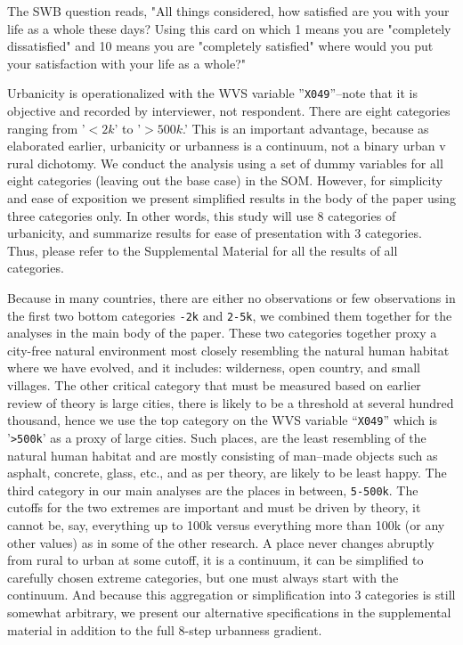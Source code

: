 \documentclass[10pt, letterpaper]{article}
\begin{document}
The SWB question reads, "All things considered, how  satisfied are you with your life as a whole these days? Using this card on which 1 means you are "completely dissatisfied" and 10 means you are "completely satisfied" where would you put your satisfaction with your life as a whole?"

Urbanicity is operationalized with the WVS variable ''\texttt{X049}''--note that it is objective and recorded by interviewer, not respondent.
There are eight categories ranging from '$<2k$' to '$>500k$.' This is an important advantage, because as elaborated earlier, urbanicity or urbanness is a continuum, not a binary urban v rural dichotomy. We conduct the analysis using a set of dummy variables for all eight categories (leaving out the base case) in the SOM. However, for simplicity and ease of exposition we present simplified results in the body of the paper using three categories only.
In other words, this study will use 8 categories of urbanicity, and summarize results for ease of presentation with 3 categories. Thus, please refer to the Supplemental Material for all the results of all categories.

Because in many countries, there are either no observations or few observations
in the first two bottom categories \texttt{-2k} and \texttt{2-5k}, we combined
them together for the analyses in the main body of the paper. These two
categories together proxy a city-free natural environment most closely resembling the natural human habitat where we have evolved, and it includes: wilderness, open country, and small villages. The other critical category that must be measured based on earlier review of theory is large cities, there is likely to be a threshold at several hundred thousand, hence we use the top category on the WVS variable ``\texttt{X049}'' which is '\texttt{>500k}' as a proxy of large cities. Such places, are the least resembling of the natural human habitat and are
mostly consisting of man--made objects such as asphalt, concrete, glass, etc., and
as per theory, are likely to be least happy. The third category in our main analyses are the places in between, \texttt{5-500k}.
%
The cutoffs for the two extremes are important and must be driven by theory, it cannot be, say, everything up to 100k versus everything more than 100k (or any other values) as in some of the other research. A place never changes abruptly from rural to urban at some cutoff, it is a continuum, it can be simplified to carefully chosen extreme categories, but one must always start with the continuum.
%
And because this aggregation or simplification into 3 categories is still
somewhat arbitrary, we present our alternative specifications in the supplemental material in addition to the full 8-step urbanness gradient. 
\end{document}
